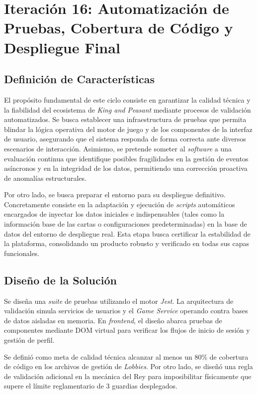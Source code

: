 \chapter[Iteración 16: Pruebas Automatizadas y Despliegue]{Iteración 16: Automatización de Pruebas, Cobertura de Código y Despliegue Final}

\section{Definición de Características}
El propósito fundamental de este ciclo consiste en garantizar la calidad técnica y la fiabilidad del ecosistema de \textit{King and Peasant} mediante procesos de validación automatizados. Se busca establecer una infraestructura de pruebas que permita blindar la lógica operativa del motor de juego y de los componentes de la interfaz de usuario, asegurando que el sistema responda de forma correcta ante diversos escenarios de interacción. Asimismo, se pretende someter al \textit{software} a una evaluación continua que identifique posibles fragilidades en la gestión de eventos asíncronos y en la integridad de los datos, permitiendo una corrección proactiva de anomalías estructurales.

Por otro lado, se busca preparar el entorno para su despliegue definitivo. Concretamente consiste en la adaptación y ejecución de \textit{scripts} automáticos encargados de inyectar los datos iniciales e indispensables (tales como la información base de las cartas o configuraciones predeterminadas) en la base de datos del entorno de despliegue real. Esta etapa busca certificar la estabilidad de la plataforma, consolidando un producto robusto y verificado en todas sus capas funcionales.

\section{Diseño de la Solución}
Se diseña una \textit{suite} de pruebas utilizando el motor \textit{Jest}. La arquitectura de validación simula servicios de usuarios y el \textit{Game Service} operando contra bases de datos aisladas en memoria. En \textit{frontend}, el diseño abarca pruebas de componentes mediante DOM virtual para verificar los flujos de inicio de sesión y gestión de perfil.

Se definió como meta de calidad técnica alcanzar al menos un 80\% de cobertura de código en los archivos de gestión de \textit{Lobbies}. Por otro lado, se diseñó una regla de validación adicional en la mecánica del Rey para imposibilitar físicamente que supere el límite reglamentario de 3 guardias desplegados.

